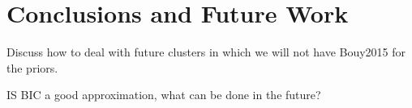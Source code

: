 \chapter{Conclusions and Future Work}
\label{chap:conclusions}

Discuss how to deal with future clusters in which we will not have Bouy2015 for the priors.

IS BIC a good approximation, what can be done in the future?